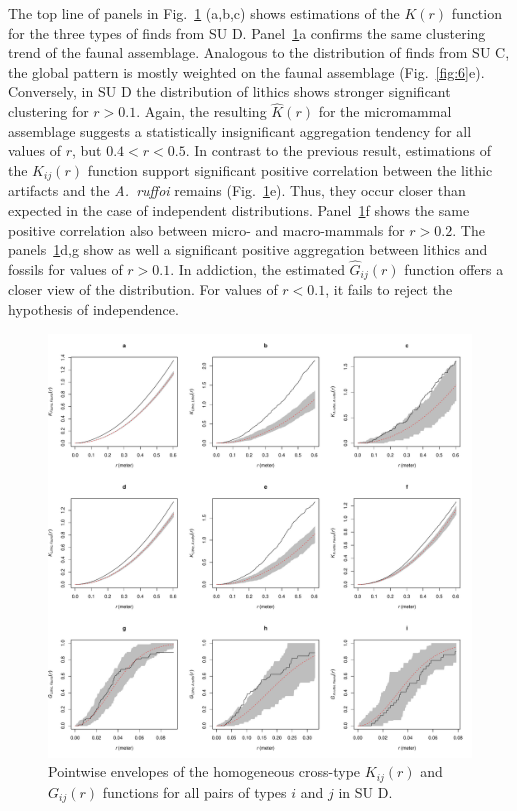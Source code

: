 \documentclass[5p,authoryear]{elsarticle} %
\begin{document}
The top line of panels in Fig.~\ref{fig:8} (a,b,c) shows estimations of the $K(r)$ function for the three types of finds from SU D. Panel~\ref{fig:8}a confirms the same clustering trend of the faunal assemblage. Analogous to the distribution of finds from SU C, the global pattern is mostly weighted on the faunal assemblage (Fig.~\ref{fig:6}e). Conversely, in SU D the distribution of lithics shows stronger significant clustering for $r>0.1$. Again, the resulting $\hat{K}(r)$ for the micromammal assemblage suggests a statistically insignificant aggregation tendency for all values of $r$, but $0.4<r<0.5$. In contrast to the previous result, estimations of the $K_{ij}(r)$ function support significant positive correlation between the lithic artifacts and the \emph{A.~ruffoi} remains (Fig.~\ref{fig:8}e). Thus, they occur closer than expected in the case of independent distributions. Panel~\ref{fig:8}f shows the same positive correlation also between micro- and macro-mammals for $r>0.2$. The panels~\ref{fig:8}d,g show as well a significant positive aggregation between lithics and fossils for values of $r>0.1$. In addiction, the estimated $\hat G_{ij}(r)$ function offers a closer view of the distribution. For values of $r<0.1$, it fails to reject the hypothesis of independence.

\begin{figure}[t]
  \centering
  \includegraphics[width=.8\textwidth]{../artwork/Fig8.pdf}
  \caption{Pointwise envelopes of the homogeneous cross-type $K_{ij}(r)$ and $G_{ij}(r)$ functions for all pairs of types $i$ and $j$ in SU D.}
  \label{fig:8}
\end{figure}
\end{document}
